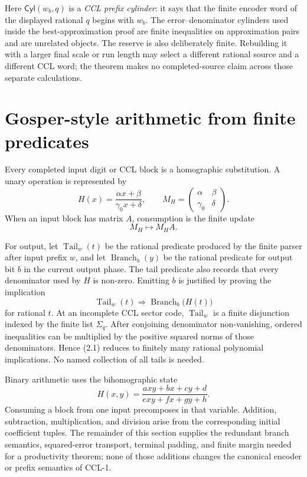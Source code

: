 \documentclass[10pt]{article}
\theoremstyle{definition}
\theoremstyle{remark}
\newcommand{\Cyl}{\mathsf{Cyl}}
\newcommand{\mat}[4]{\begin{pmatrix}#1&#2\\#3&#4\end{pmatrix}}
\begin{document}
Here $\Cyl(w_b,q)$ is a \emph{CCL prefix cylinder}: it says that the finite
encoder word of the displayed rational $q$ begins with $w_b$.  The
error--denominator cylinders used inside the best-approximation proof are
finite inequalities on approximation pairs and are unrelated objects.  The
reserve is also deliberately finite.  Rebuilding it with a larger final
scale or run length may select a different rational source and a different
CCL word; the theorem makes no completed-source claim across those separate
calculations.

\section{Gosper-style arithmetic from finite predicates}
\label{sec:arithmetic}

Every completed input digit or CCL block is a homographic substitution.  A unary operation is represented by
\[
 H(x)=\frac{\alpha x+\beta}{\gamma_0x+\delta},
 \qquad
 M_H=\mat{\alpha}{\beta}{\gamma_0}{\delta}.
\]
When an input block has matrix $A$, consumption is the finite update
\[
 M_H\longmapsto M_HA.
\]

For output, let $\operatorname{Tail}_w(t)$ be the rational predicate produced by the finite parser after input prefix $w$, and let $\operatorname{Branch}_b(y)$ be the rational predicate for output bit $b$ in the current output phase.  The tail predicate also records that every denominator used by $H$ is non-zero.  Emitting $b$ is justified by proving the implication
\[
 \operatorname{Tail}_w(t)\Longrightarrow
 \operatorname{Branch}_b\bigl(H(t)\bigr)
\tag{2.1}
\]
for rational $t$.  At an incomplete CCL sector code, $\operatorname{Tail}_w$ is a finite disjunction indexed by the finite list $\Sigma_q$.  After conjoining denominator non-vanishing, ordered inequalities can be multiplied by the positive squared norms of those denominators.  Hence (2.1) reduces to finitely many rational polynomial implications.  No named collection of all tails is needed.

Binary arithmetic uses the bihomographic state
\[
H(x,y)=\frac{axy+bx+cy+d}{exy+fx+gy+h}.
\]
Consuming a block from one input precomposes in that variable.  Addition,
subtraction, multiplication, and division arise from the corresponding
initial coefficient tuples.  The remainder of this section supplies the
redundant branch semantics, squared-error transport, terminal padding, and
finite margin needed for a productivity theorem; none of those additions
changes the canonical encoder or prefix semantics of CCL-1.
\end{document}
